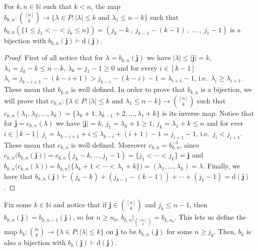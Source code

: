 \begin{proposition}\label{prop:poset_bijection} For $k,n\in\mathbb{N}$ such that $k<n$, the map $b_{k,n}:\binom{[n]}{k}\to\big\{\lambda\in P:|\lambda|\leq k\text{ and }\lambda_1\leq n-k\big\}$ such that $b_{k,n}(\{1\leq j_1<\cdots<j_k\leq n\})=(j_k-k\ ,\ j_{k-1}-(k-1)\ ,\ \ldots\ ,\ j_1-1)$ is a bijection with $b_{k,n}(\mathbf{j})\vdash\mathrm{d}(\mathbf{j})$.
\end{proposition}
\begin{proof} First of all notice that for $\lambda=b_{k,n}(\mathbf{j})$ we have $|\lambda|\leq|\mathbf{j}|=k$, $\lambda_1=j_k-k\leq n-k$, $\lambda_k=j_1-1\geq 0$ and for every $i\in[k-1]$ $\lambda_i=j_{k-i+1}-(k-i+1)>j_{k-i}-(k-i)-1=\lambda_{i+1}-1$, i.e.\ $\lambda_i\geq\lambda_{i+1}$. These mean that $b_{k,n}$ is well defined. In order to prove that $b_{k,n}$ is a bijection, we will prove that $c_{k,n}:\big\{\lambda\in P:|\lambda|\leq k\text{ and }\lambda_1\leq n-k\big\}\to\binom{[n]}{k}$ such that $c_{k,n}(\lambda_1,\lambda_2,\ldots,\lambda_k)=\{\lambda_k+1,\lambda_{k-1}+2,\ldots,\lambda_1+k\}$ is its inverse map. Notice that for $\mathbf{j}=c_{k,n}(\lambda)$ we have $|\mathbf{j}|=k$, $j_1=\lambda_k+1\geq1$, $j_k=\lambda_1+k\leq n$ and for ever $i\in[k-1]$ $j_i=\lambda_{k-i+1}+i\leq\lambda_{k-i}+(i+1)-1=j_{i+1}-1$, i.e.\ $j_i<j_{i+1}$. These mean that $c_{k,n}$ is well defined. Moreover $c_{k,n}=b_{k,n}^{-1}$, since $c_{k,n}\big(b_{k,n}(\mathbf{j})\big)=c_{k,n}(j_k-k,\ldots,j_1-1)=\{j_1<\cdots<j_k\}=\mathbf{j}$ and $b_{k,n}\big(c_{k,n}(\lambda)\big)=b_{k,n}\big(\{\lambda_k+1<\cdots<\lambda_1+k\}\big)=(\lambda_1,\ldots,\lambda_k)=\lambda$. Finally, we have that $b_{k,n}(\mathbf{j})\vdash (j_k-k)+(j_{k-1}-(k-1))+\cdots+(j_1-1)=\mathrm{d}(\mathbf{j})$.
\end{proof}
\begin{remark}\label{rem:inf_poset_bijection} Fix some $k\in\mathbb{N}$ and notice that if $\mathbf{j}\in\binom{[n]}{k}$ and $j_k\leq n-1$, then $b_{k,n}(\mathbf{j})=b_{k,n-1}(\mathbf{j})$, so for $n\geq n_0$, $b_{k,n}|_{\binom{[n_0]}{k}}=b_{k,n_0}$. This lets us define the map $b_k:\binom{\mathbb{N}}{k}\to\big\{\lambda\in P:|\lambda|\leq k\}$ on $\mathbf{j}$ to be $b_{k,n}(\mathbf{j})$ for some $n\geq j_k$. Then, $b_k$ is also a bijection with $b_k(\mathbf{j})\vdash\mathrm{d}(\mathbf{j})$.
\end{remark}

